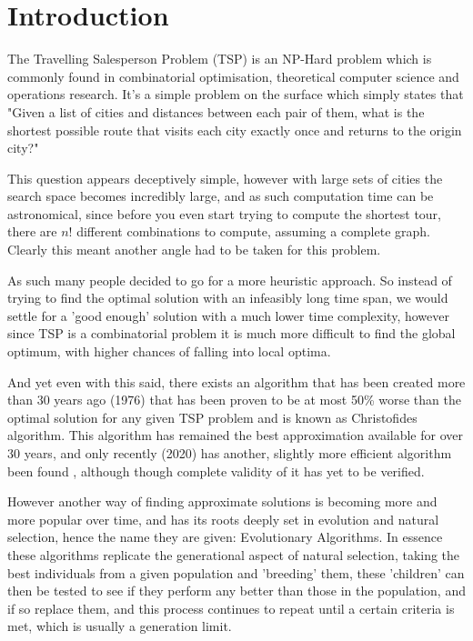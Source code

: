 \documentclass[11pt,a4paper,titlepage]{article}
\begin{document}
\section{Introduction}

The Travelling Salesperson Problem (TSP) is an NP-Hard problem which is commonly found in combinatorial optimisation, theoretical computer science and operations research. It's a simple problem on the surface which simply states that "Given a list of cities and distances between each pair of them, what is the shortest possible route that visits each city exactly once and returns to the origin city?" \cite{TSPWiki}

This question appears deceptively simple, however with large sets of cities the search space becomes incredibly large, and as such computation time can be astronomical, since before you even start trying to compute the shortest tour, there are $n!$ different combinations to compute, assuming a complete graph. Clearly this meant another angle had to be taken for this problem.

As such many people decided to go for a more heuristic approach. So instead of trying to find the optimal solution with an infeasibly long time span, we would settle for a 'good enough' solution with a much lower time complexity, however since TSP is a combinatorial problem it is much more difficult to find the global optimum, with higher chances of falling into local optima.

And yet even with this said, there exists an algorithm that has been created more than 30 years ago (1976) that has been proven to be at most 50\% worse than the optimal solution for any given TSP problem and is known as Christofides algorithm. This algorithm has remained the best approximation available for over 30 years, and only recently (2020) has another, slightly more efficient algorithm been found \cite{TSP2020}, although though complete validity of it has yet to be verified.

However another way of finding approximate solutions is becoming more and more popular over time, and has its roots deeply set in evolution and natural selection, hence the name they are given: Evolutionary Algorithms. In essence these algorithms replicate the generational aspect of natural selection, taking the best individuals from a given population and 'breeding' them, these 'children' can then be tested to see if they perform any better than those in the population, and if so replace them, and this process continues to repeat until a certain criteria is met, which is usually a generation limit.
\end{document}
